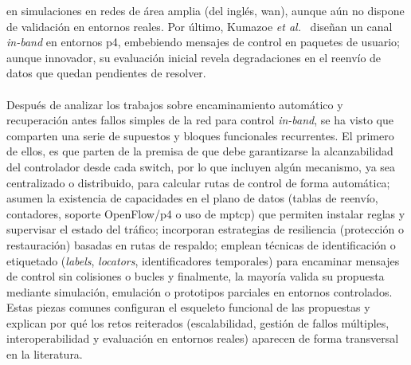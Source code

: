 en simulaciones en redes de área amplia (del inglés, \gls{wan}), aunque aún no dispone de validación en entornos reales.  Por último, Kumazoe \textit{et al.}~\cite{Kumazoe22} diseñan un canal \textit{in-band} en entornos \gls{p4}, embebiendo mensajes de control en paquetes de usuario; aunque innovador, su evaluación inicial revela degradaciones en el reenvío de datos que quedan pendientes de resolver.\\
\\
Después de analizar los trabajos sobre encaminamiento automático y recuperación antes fallos simples de la red para control \textit{in-band}, se ha visto que comparten una serie de supuestos y bloques funcionales recurrentes. El primero de ellos, es que parten de la premisa de que debe garantizarse la alcanzabilidad del controlador desde cada switch, por lo que incluyen algún mecanismo, ya sea centralizado o distribuido, para calcular rutas de control de forma automática; asumen la existencia de capacidades en el plano de datos (tablas de reenvío, contadores, soporte OpenFlow/\gls{p4} o uso de \gls{mptcp}) que permiten instalar reglas y supervisar el estado del tráfico; incorporan estrategias de resiliencia (protección o restauración) basadas en rutas de respaldo; emplean técnicas de identificación o etiquetado (\textit{labels}, \textit{locators}, identificadores temporales) para encaminar mensajes de control sin colisiones o bucles y finalmente, la mayoría valida su propuesta mediante simulación, emulación o prototipos parciales en entornos controlados. Estas piezas comunes configuran el esqueleto funcional de las propuestas y explican por qué los retos reiterados (escalabilidad, gestión de fallos múltiples, interoperabilidad y evaluación en entornos reales) aparecen de forma transversal en la literatura.\\
\\
